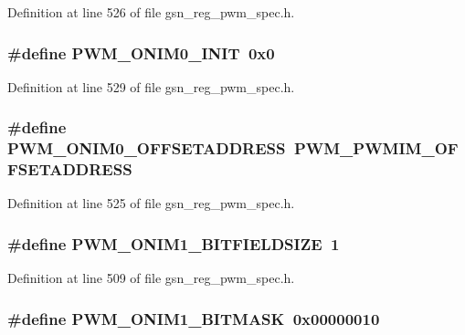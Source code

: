 Definition at line 526 of file gsn\_\-reg\_\-pwm\_\-spec.h.

\hypertarget{a00565_aaf81938645250f5383f7dd5d429d4981}{
\subsubsection[{PWM\_\-ONIM0\_\-INIT}]{\setlength{\rightskip}{0pt plus 5cm}\#define PWM\_\-ONIM0\_\-INIT~0x0}}
\label{a00565_aaf81938645250f5383f7dd5d429d4981}


Definition at line 529 of file gsn\_\-reg\_\-pwm\_\-spec.h.

\hypertarget{a00565_ababcd59a5db5295a3854b983e91e1032}{
\subsubsection[{PWM\_\-ONIM0\_\-OFFSETADDRESS}]{\setlength{\rightskip}{0pt plus 5cm}\#define PWM\_\-ONIM0\_\-OFFSETADDRESS~PWM\_\-PWMIM\_\-OFFSETADDRESS}}
\label{a00565_ababcd59a5db5295a3854b983e91e1032}


Definition at line 525 of file gsn\_\-reg\_\-pwm\_\-spec.h.

\hypertarget{a00565_ab5c9df7bd6f64d10ddd1653e921dc6c6}{
\subsubsection[{PWM\_\-ONIM1\_\-BITFIELDSIZE}]{\setlength{\rightskip}{0pt plus 5cm}\#define PWM\_\-ONIM1\_\-BITFIELDSIZE~1}}
\label{a00565_ab5c9df7bd6f64d10ddd1653e921dc6c6}


Definition at line 509 of file gsn\_\-reg\_\-pwm\_\-spec.h.

\hypertarget{a00565_ad3f1f166f59fc9435af3dd3ccb336033}{
\subsubsection[{PWM\_\-ONIM1\_\-BITMASK}]{\setlength{\rightskip}{0pt plus 5cm}\#define PWM\_\-ONIM1\_\-BITMASK~0x00000010}}
\label{a00565_ad3f1f166f59fc9435af3dd3ccb336033}


